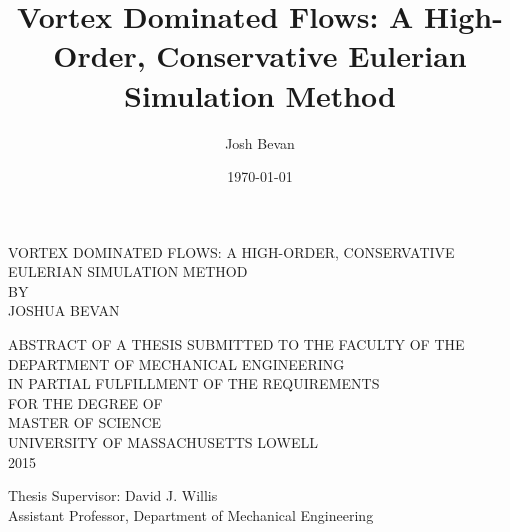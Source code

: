 \documentclass[letterpaper,12pt]{report}
\title{Vortex Dominated Flows: A High-Order, Conservative Eulerian Simulation Method}
\author{Josh Bevan}
\date{\today}
\begin{document}
\begin{center}
\setcounter{page}{2}
\large VORTEX DOMINATED FLOWS: A HIGH-ORDER, CONSERVATIVE EULERIAN SIMULATION METHOD\\
\vspace{1cm}\normalsize BY\\
\vspace{1cm}\normalsize JOSHUA BEVAN

\vspace{1cm} \normalsize ABSTRACT OF A THESIS SUBMITTED TO THE FACULTY OF THE\\
DEPARTMENT OF MECHANICAL ENGINEERING\\
IN PARTIAL FULFILLMENT OF THE REQUIREMENTS\\
FOR THE DEGREE OF\\
MASTER OF SCIENCE\\
UNIVERSITY OF MASSACHUSETTS LOWELL\\
2015\\
\end{center}
Thesis Supervisor: David J. Willis\\
Assistant Professor, Department of Mechanical Engineering
\end{document}
